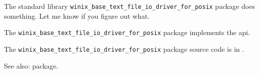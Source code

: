 
The standard library {\tt winix\_base\_text\_file\_io\_driver\_for\_posix} package does something.  Let me know if you figure out what.

The {\tt winix\_base\_text\_file\_io\_driver\_for\_posix} package implements the  api.

The {\tt winix\_base\_text\_file\_io\_driver\_for\_posix} package source code is in 
.

See also:   package.
